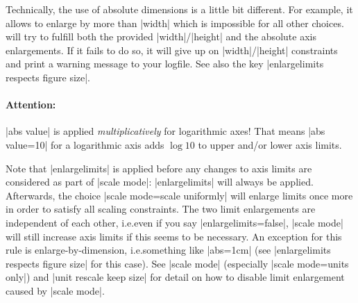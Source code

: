 \begin{pgfplotsxykeylist}
\begin{codeexample}[]
\end{codeexample}
    \noindent Technically, the use of absolute dimensions is a little bit
    different. For example, it allows to enlarge by more than |width| which is
    impossible for all other choices. \PGFPlots{} will try to fulfill both the
    provided |width|/|height| and the absolute axis enlargements. If it fails
    to do so, it will give up on |width|/|height| constraints and print a
    warning message to your logfile. See also the key
    |enlargelimits respects figure size|.


    \paragraph{Attention:}

    |abs value| is applied \emph{multiplicatively} for logarithmic axes! That
    means |abs value=10| for a logarithmic axis adds $\log 10$ to upper and/or
    lower axis limits.
\begin{codeexample}[]
\end{codeexample}

    Note that |enlargelimits| is applied before any changes to axis limits are
    considered as part of |scale mode|: |enlargelimits| will always be applied.
    Afterwards, the choice |scale mode=scale uniformly| will enlarge limits
    once more in order to satisfy all scaling constraints. The two limit
    enlargements are independent of each other, i.e.\@ even if you say
    |enlargelimits=false|, |scale mode| will still increase axis limits if this
    seems to be necessary. An exception for this rule is enlarge-by-dimension,
    i.e.\@ something like |abs=1cm| (see |enlargelimits respects figure size|
    for this case). See |scale mode| (especially |scale mode=units only|) and
    |unit rescale keep size| for detail on how to disable limit enlargement
    caused by |scale mode|.
\end{pgfplotsxykeylist}

